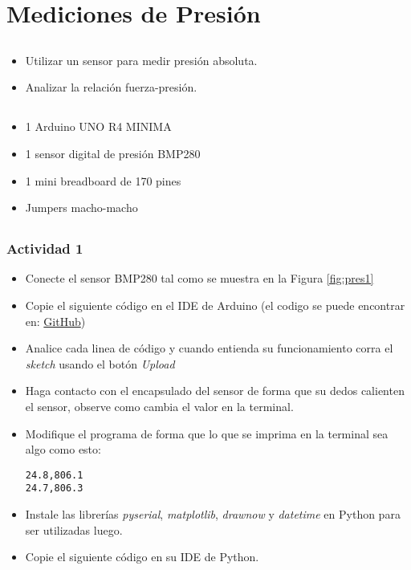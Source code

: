 \chapter{Mediciones de Presión}
\section{\obj}
\capacidad
\begin{itemize}
\item Utilizar un sensor para medir presión absoluta.
\item Analizar la relación fuerza-presión.
\end{itemize}

\section{\mat}
\begin{itemize}
\item 1 Arduino UNO R4 MINIMA
\item 1 sensor digital de presión BMP280
\item 1 mini breadboard de 170 pines
\item Jumpers macho-macho
\end{itemize}


\section{\pro}
\subsection{Actividad 1}
\begin{itemize}
    \item Conecte el sensor BMP280 tal como se muestra en la Figura \ref{fig:pres1}
    \item Copie el siguiente código en el IDE de Arduino (el codigo se puede encontrar en: \href{https://github.com/juanjorojash/instrumentacion_I/blob/master/algoritmos/BMP280/BMP280_lib/BMP280_lib.ino}{GitHub})
      
    \item Analice cada linea de código y cuando entienda su funcionamiento corra el \emph{sketch} usando el botón \emph{Upload}
    \item Haga contacto con el encapsulado del sensor de forma que su dedos calienten el sensor, observe como cambia el valor en la terminal. 
    \item Modifique el programa de forma que lo que se imprima en la terminal sea algo como esto:
\begin{verbatim}
24.8,806.1
24.7,806.3
\end{verbatim}
    \item Instale las librerías \emph{pyserial}, \emph{matplotlib}, \emph{drawnow} y \emph{datetime} en Python para ser utilizadas luego.
    \item Copie el siguiente código en su IDE de Python.
    
\end{itemize}


